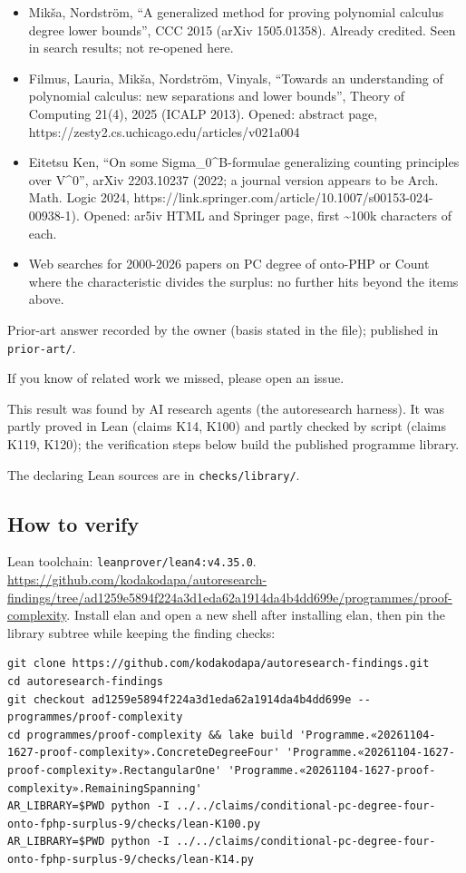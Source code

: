 \documentclass{article}
\begin{document}
\begin{itemize}
\item Mikša, Nordström, ``A generalized method for proving polynomial calculus degree lower bounds'', CCC 2015 (arXiv 1505.01358). Already credited. Seen in search results; not re-opened here.
\item Filmus, Lauria, Mikša, Nordström, Vinyals, ``Towards an understanding of polynomial calculus: new separations and lower bounds'', Theory of Computing 21(4), 2025 (ICALP 2013). Opened: abstract page, https://zesty2.cs.uchicago.edu/articles/v021a004
\item Eitetsu Ken, ``On some Sigma\_0\textasciicircum{}B-formulae generalizing counting principles over V\textasciicircum{}0'', arXiv 2203.10237 (2022; a journal version appears to be Arch. Math. Logic 2024, https://link.springer.com/article/10.1007/s00153-024-00938-1). Opened: ar5iv HTML and Springer page, first \textasciitilde{}100k characters of each.
\item Web searches for 2000-2026 papers on PC degree of onto-PHP or Count where the characteristic divides the surplus: no further hits beyond the items above.
\end{itemize}

Prior-art answer recorded by the owner (basis stated in the file); published in \texttt{prior-art/}.

If you know of related work we missed, please open an issue.

This result was found by AI research agents (the autoresearch harness). It was partly proved in Lean (claims K14, K100) and partly checked by script (claims K119, K120); the verification steps below build the published programme library.

The declaring Lean sources are in \texttt{checks/library/}.

\subsection*{How to verify}

Lean toolchain: \texttt{leanprover/lean4:v4.35.0}. \url{https://github.com/kodakodapa/autoresearch-findings/tree/ad1259e5894f224a3d1eda62a1914da4b4dd699e/programmes/proof-complexity}. Install elan and open a new shell after installing elan, then pin the library subtree while keeping the finding checks:

\begin{verbatim}
git clone https://github.com/kodakodapa/autoresearch-findings.git
cd autoresearch-findings
git checkout ad1259e5894f224a3d1eda62a1914da4b4dd699e -- programmes/proof-complexity
cd programmes/proof-complexity && lake build 'Programme.«20261104-1627-proof-complexity».ConcreteDegreeFour' 'Programme.«20261104-1627-proof-complexity».RectangularOne' 'Programme.«20261104-1627-proof-complexity».RemainingSpanning'
AR_LIBRARY=$PWD python -I ../../claims/conditional-pc-degree-four-onto-fphp-surplus-9/checks/lean-K100.py
AR_LIBRARY=$PWD python -I ../../claims/conditional-pc-degree-four-onto-fphp-surplus-9/checks/lean-K14.py
\end{verbatim}
\end{document}
